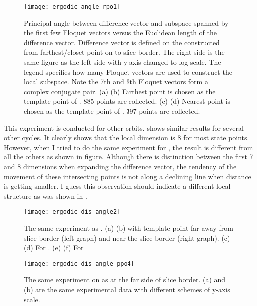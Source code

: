 \begin{description}
\begin{figure}[h]
  \centering
  \texttt{[image: ergodic\_angle\_rpo1]}
  \caption{
    Principal angle between difference vector and subspace spanned by the
    first few Floquet vectors versus the Euclidean length of the difference
    vector. Difference vector is defined on the {\PoincSec} constructed
    from farthest/closet point on  to slice border.
    The right side
    is the same figure as the left side with y-axis changed to log scale.
    The legend specifies how many Floquet vectors are used to construct
    the local subspace. Note the 7th and 8th Floquet vectors form a
    complex conjugate pair.
    (a) (b) Farthest point is chosen as the template point of {\PoincSec}. 885 points are collected.
    (c) (d) Nearest point is chosen as the template point of {\PoincSec}.  397 points are collected.
  }
  \label{fig:ergodic_dis_angle_rpo1}
\end{figure}

This experiment is conducted for other orbits.
 shows similar results for several
other cycles. It clearly shows that the local dimension
is 8 for most state points. However, when I tried to do
the same experiment for , the result is different
from all the others as shown in figure. Although there is distinction
between the first 7 and 8 dimensions when expanding the difference
vector, the tendency of the movement of these intersecting
points is not along a
declining line when distance is getting smaller. I guess this
observation should indicate
a different local structure as was shown in
 .

\begin{figure}[h]
  \centering
  \texttt{[image: ergodic\_dis\_angle2]}
  \caption{
    The same experiment as .
    (a) (b)  with {\Poincare} template point far away
    from slice border (left graph) and near the slice border
    (right graph).
    (c) (d) For .
    (e) (f) For 
  }
  \label{fig:ergodic_dis_angle2}
\end{figure}

\begin{figure}[h]
  \centering
  \texttt{[image: ergodic\_dis\_angle\_ppo4]}
  \caption{
    The same experiment on  as  at the far side of slice border.
    (a) and (b) are the same
    experimental data with different schemes of y-axis scale.
   }
  \label{fig:ergodic_dis_angle_ppo4}
\end{figure}



\end{description}
